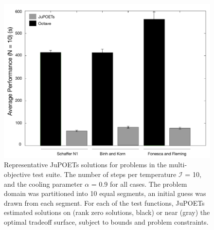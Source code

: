 \documentclass[12pt]{article}
\begin{document}
\begin{figure}[h]
  \includegraphics[width=1.0\textwidth]{./figs/Figure-3-PerformanceComparison.pdf}
  \caption{Representative JuPOETs solutions for problems in the multi-objective test suite.
  The number of steps per temperature $\mathcal{I}$ = 10, and the cooling parameter $\alpha$ = 0.9 for all cases.
  The problem domain was partitioned into 10 equal segments, an initial guess was drawn from each segment.
  For each of the test functions, JuPOETs estimated solutions on (rank zero solutions, black) or near (gray) the optimal tradeoff surface, subject to bounds and problem constraints.  }\label{fig:fig-surfaces}
\end{figure}
\end{document}
